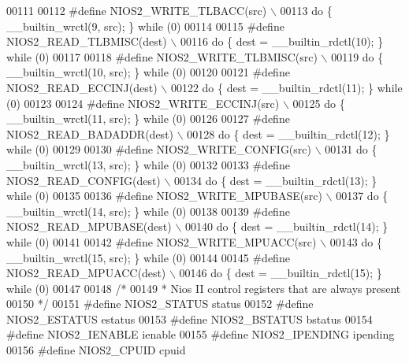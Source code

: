 \begin{DoxyCode}
{{{00111 
00112 \textcolor{preprocessor}{#define NIOS2\_WRITE\_TLBACC(src) \(\backslash\)}
00113 \textcolor{preprocessor}{    do \{ \_\_builtin\_wrctl(9, src); \} while (0)}
00114 
00115 \textcolor{preprocessor}{#define NIOS2\_READ\_TLBMISC(dest) \(\backslash\)}
00116 \textcolor{preprocessor}{    do \{ dest = \_\_builtin\_rdctl(10); \} while (0)}
00117 
00118 \textcolor{preprocessor}{#define NIOS2\_WRITE\_TLBMISC(src) \(\backslash\)}
00119 \textcolor{preprocessor}{    do \{ \_\_builtin\_wrctl(10, src); \} while (0)}
00120 
00121 \textcolor{preprocessor}{#define NIOS2\_READ\_ECCINJ(dest) \(\backslash\)}
00122 \textcolor{preprocessor}{    do \{ dest = \_\_builtin\_rdctl(11); \} while (0)}
00123 
00124 \textcolor{preprocessor}{#define NIOS2\_WRITE\_ECCINJ(src) \(\backslash\)}
00125 \textcolor{preprocessor}{    do \{ \_\_builtin\_wrctl(11, src); \} while (0)}
00126 
00127 \textcolor{preprocessor}{#define NIOS2\_READ\_BADADDR(dest) \(\backslash\)}
00128 \textcolor{preprocessor}{    do \{ dest = \_\_builtin\_rdctl(12); \} while (0)}
00129 
00130 \textcolor{preprocessor}{#define NIOS2\_WRITE\_CONFIG(src) \(\backslash\)}
00131 \textcolor{preprocessor}{    do \{ \_\_builtin\_wrctl(13, src); \} while (0)}
00132 
00133 \textcolor{preprocessor}{#define NIOS2\_READ\_CONFIG(dest) \(\backslash\)}
00134 \textcolor{preprocessor}{    do \{ dest = \_\_builtin\_rdctl(13); \} while (0)}
00135 
00136 \textcolor{preprocessor}{#define NIOS2\_WRITE\_MPUBASE(src) \(\backslash\)}
00137 \textcolor{preprocessor}{    do \{ \_\_builtin\_wrctl(14, src); \} while (0)}
00138 
00139 \textcolor{preprocessor}{#define NIOS2\_READ\_MPUBASE(dest) \(\backslash\)}
00140 \textcolor{preprocessor}{    do \{ dest = \_\_builtin\_rdctl(14); \} while (0)}
00141 
00142 \textcolor{preprocessor}{#define NIOS2\_WRITE\_MPUACC(src) \(\backslash\)}
00143 \textcolor{preprocessor}{    do \{ \_\_builtin\_wrctl(15, src); \} while (0)}
00144 
00145 \textcolor{preprocessor}{#define NIOS2\_READ\_MPUACC(dest) \(\backslash\)}
00146 \textcolor{preprocessor}{    do \{ dest = \_\_builtin\_rdctl(15); \} while (0)}
00147 
00148 \textcolor{comment}{/*}
00149 \textcolor{comment}{ * Nios II control registers that are always present}
00150 \textcolor{comment}{ */}
00151 \textcolor{preprocessor}{#define NIOS2\_STATUS   status}
00152 \textcolor{preprocessor}{#define NIOS2\_ESTATUS  estatus}
00153 \textcolor{preprocessor}{#define NIOS2\_BSTATUS  bstatus}
00154 \textcolor{preprocessor}{#define NIOS2\_IENABLE  ienable}
00155 \textcolor{preprocessor}{#define NIOS2\_IPENDING ipending}
00156 \textcolor{preprocessor}{#define NIOS2\_CPUID cpuid}
}}}
\end{DoxyCode}
